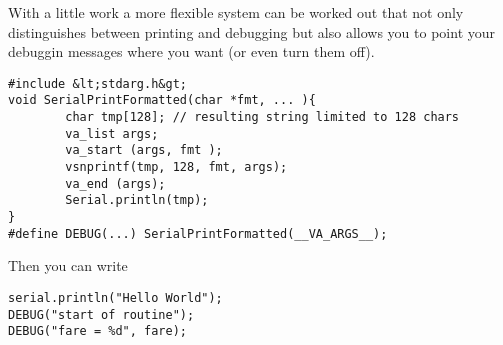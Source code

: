 \documentclass{book}
\begin{document}
With a little work a more flexible system can be worked out that not only distinguishes between printing and debugging but also allows you to point your debuggin messages where you want (or even turn them off).
\begin{verbatim}
#include &lt;stdarg.h&gt;
void SerialPrintFormatted(char *fmt, ... ){
        char tmp[128]; // resulting string limited to 128 chars
        va_list args;
        va_start (args, fmt );
        vsnprintf(tmp, 128, fmt, args);
        va_end (args);
        Serial.println(tmp);
}
#define DEBUG(...) SerialPrintFormatted(__VA_ARGS__);
\end{verbatim}

Then you can write
\begin{verbatim}
serial.println("Hello World");
DEBUG("start of routine");
DEBUG("fare = %d", fare);
\end{verbatim}
\end{document}
